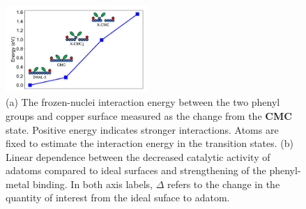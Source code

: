 \documentclass[journal=jacsat,manuscript=article]{achemso}
\begin{document}
\begin{figure}[hbt]
\centering
\includegraphics[width=0.48\textwidth]{Fig/onlysurface.pdf}
\caption{
(a) The frozen-nuclei interaction energy between the two phenyl groups and copper surface measured as the change from the \textbf{CMC} state. Positive energy indicates stronger interactions. Atoms are fixed to estimate the interaction energy in the transition states. (b) Linear dependence between the decreased catalytic activity of adatoms compared to ideal surfaces and strengthening of the phenyl-metal binding. In both axis labels, $\Delta$ refers to the change in the quantity of interest from the ideal suface to adatom.}
\label{fig:onlysurface}
\end{figure}
\end{document}

